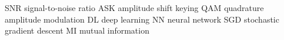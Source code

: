 \makeglossaries %
%
%
%
%
%
%
%
 {SNR} {signal-to-noise ratio}
%
 {ASK} {amplitude shift keying}
%
 {QAM} {quadrature amplitude modulation}
%
 {DL} {deep learning}
%
 {NN} {neural network}
%
 {SGD} {stochastic gradient descent}
%
 {MI} {mutual information}